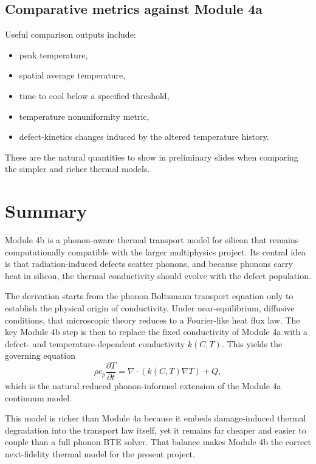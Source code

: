 \documentclass[11pt]{article}
\begin{document}
\subsection{Comparative metrics against Module 4a}
Useful comparison outputs include:
\begin{itemize}
    \item peak temperature,
    \item spatial average temperature,
    \item time to cool below a specified threshold,
    \item temperature nonuniformity metric,
    \item defect-kinetics changes induced by the altered temperature history.
\end{itemize}

These are the natural quantities to show in preliminary slides when comparing the simpler and richer thermal models.

\section{Summary}

Module 4b is a phonon-aware thermal transport model for silicon that remains computationally compatible with the larger multiphysics project. Its central idea is that radiation-induced defects scatter phonons, and because phonons carry heat in silicon, the thermal conductivity should evolve with the defect population.

The derivation starts from the phonon Boltzmann transport equation only to establish the physical origin of conductivity. Under near-equilibrium, diffusive conditions, that microscopic theory reduces to a Fourier-like heat flux law. The key Module 4b step is then to replace the fixed conductivity of Module 4a with a defect- and temperature-dependent conductivity $k(C,T)$. This yields the governing equation
\begin{equation}
\rho c_p \frac{\partial T}{\partial t} = \nabla\cdot\left(k(C,T)\nabla T\right)+Q,
\end{equation}
which is the natural reduced phonon-informed extension of the Module 4a continuum model.

This model is richer than Module 4a because it embeds damage-induced thermal degradation into the transport law itself, yet it remains far cheaper and easier to couple than a full phonon BTE solver. That balance makes Module 4b the correct next-fidelity thermal model for the present project.
\end{document}
